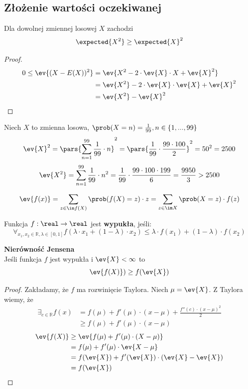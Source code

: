 \subsection{Złożenie wartości oczekiwanej}

\begin{theorem} Dla dowolnej zmiennej losowej \(X\) zachodzi
	\[
		\expected{X^2} \geq \expected{X}^2
	\]
\end{theorem}
\begin{proof}
    \begin{align*}
        0 \leq \ev{(X - E(X))^2} &= \ev{X^2 - 2 \cdot \ev{X} \cdot X + \ev{X}^2} \\
        &= \ev{X^2} - 2 \cdot \ev{X} \cdot \ev{X} + \ev{X}^2 \\
        &= \ev{X^2} - \ev{X}^2
    \end{align*}
\end{proof}
\begin{example} Niech \(X\) to zmienna losowa, \(\prob(X = n) = \frac{1}{99}, n \in \{1,...,99\}\)
    \[
        \ev{X}^2 = \pars{\sum_{n = 1}^{99} \frac{1}{99} \cdot n}^2 = \pars{\frac{1}{99} \cdot \frac{99 \cdot 100}{2}}^2 = 50^2 = 2500
    \]
    \[
        \ev{X^2} = \sum_{n = 1}^{99} \frac{1}{99} \cdot n^2 = \frac{1}{99} \cdot \frac{99 \cdot 100 \cdot 199}{6} = \frac{9950}{3} > 2500
    \]
\end{example}

\begin{fact}
	\[
		\ev{f(x)} = \sum_{z \in \im f(X)} \prob(f(X) = z) \cdot z = \sum_{z \in \im X} \prob(X = z) \cdot f(z)
	\]
\end{fact}

\begin{definition} Funkcja \(f : \real \rightarrow \real\) jest \textbf{wypukła}, jeśli:
	\[
		\forall_{x_1, x_2 \in \mathbb{R}, \lambda \in [0,1]} f(\lambda \cdot x_1 + (1-\lambda) \cdot x_2) \leq \lambda \cdot f(x_1) + (1 - \lambda) \cdot f(x_2)
	\]
\end{definition}

\begin{theorem} \textbf{Nierówność Jensena}\\
	Jeśli funkcja \(f\) jest wypukła i \(\ev{X} < \infty\) to 
	\[
		\ev{f(X)}) \geq f(\ev{X})
	\]
\end{theorem}
\begin{proof} Zakładamy, że \(f\) ma rozwinięcie Taylora. Niech \(\mu = \ev{X}\). Z Taylora wiemy, że
	\begin{align*}
        \exists_{c \in \mathbb{R}} f(x) &= f(\mu) + f'(\mu) \cdot (x - \mu) + \frac{f''(c) \cdot (x - \mu)^2}{2} \\
        &\geq f(\mu) + f'(\mu) \cdot (x - \mu)
    \end{align*}
    \begin{align*}
        \ev{f(X)} &\geq \ev{f(\mu) + f'(\mu) \cdot (X - \mu)} \\
        &= f(\mu) + f'(\mu) \cdot \ev{X - \mu} \\
        &= f(\ev{X}) + f'(\ev{X}) \cdot (\ev{X} - \ev{X}) \\
        &= f(\ev{X})
    \end{align*}
\end{proof}

